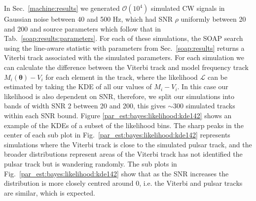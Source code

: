 In Sec.~\ref{machine:results} we generated $\mathcal{O}(10^{4})$ simulated \gls{CW} signals in Gaussian noise between 40 and 500 Hz, which had \gls{SNR} $\rho$ uniformly between 20 and 200 and source parameters which follow that in Tab.~\ref{soap:results:parameters}. For each of these simulations, the SOAP search using the line-aware statistic with parameters from Sec.~\ref{soap:results} returns a Viterbi track associated with the simulated parameters.
For each simulation we can calculate the difference between the Viterbi track and model frequency track $M_i(\bm{\theta}) - V_i$ for each element in the track, where the likelihood $\mathcal{L}$ can be estimated by taking the \gls{KDE} of all our values of $M_i - V_i$.
In this case our likelihood is also dependent on \gls{SNR}, therefore, we split our simulations into bands of width \gls{SNR} 2 between 20 and 200, this gives $\sim 300$ simulated tracks within each \gls{SNR} bound.
Figure \ref{par_est:bayes:likelihood:kde142} shows an example of the \glspl{KDE} of a subset of the likelihood bins. 
The sharp peaks in the center of each sub plot in Fig.~\ref{par_est:bayes:likelihood:kde142} represents simulations where the Viterbi track is close to the simulated pulsar track, and the broader distributions represent areas of the Viterbi track has not identified the pulsar track but is wandering randomly.
The sub plots in Fig.~\ref{par_est:bayes:likelihood:kde142} show that as the \gls{SNR} increases the distribution is more closely centred around 0, i.e. the Viterbi and pulsar tracks are similar, which is expected.
%
